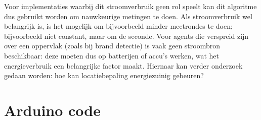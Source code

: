 \documentclass[a4paper,10pt]{article}
\begin{document}
Voor implementaties waarbij dit stroomverbruik geen rol speelt kan dit algoritme dus gebruikt worden om nauwkeurige metingen te doen. Als stroomverbruik wel belangrijk is, is het mogelijk om bijvoorbeeld minder meetrondes te doen; bijvoorbeeld niet constant, maar om de seconde. Voor agents die verspreid zijn over een oppervlak (zoals bij brand detectie) is vaak geen stroombron beschikbaar: deze moeten dus op batterijen of accu's werken, wat het energieverbruik een belangrijke factor maakt. Hiernaar kan verder onderzoek gedaan worden: hoe kan locatiebepaling energiezuinig gebeuren?
    



\newpage
\appendix
\section{Arduino code}
\label{sec:code}

\end{document}
